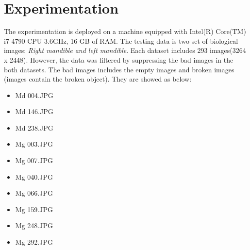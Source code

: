 \section{Experimentation}
The experimentation is deployed on a machine equipped with Intel(R) Core(TM) i7-4790 CPU 3.6GHz, 16 GB of RAM. The testing data is two set of biological images: \textit{Right mandible and left mandible}. Each dataset includes 293 images(3264 x 2448). However, the data was filtered by suppressing the bad images in the both datasets. The bad images includes the empty images and broken images (images contain the broken object). They are showed as below:
\begin{multicols}{3}
\begin{itemize}
\item Md 004.JPG
\item Md 146.JPG
\item Md 238.JPG
\item Mg 003.JPG
\item Mg 007.JPG
\item Mg 040.JPG
\item Mg 066.JPG
\item Mg 159.JPG
\item Mg 248.JPG
\item Mg 292.JPG
\end{itemize} 
\end{multicols}

